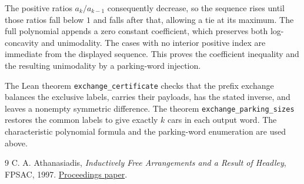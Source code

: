 \documentclass[11pt]{article}
\begin{document}
The positive ratios $a_k/a_{k-1}$ consequently decrease, so the
sequence rises until those ratios fall below $1$ and falls after
that, allowing a tie at its maximum. The full polynomial appends
a zero constant coefficient, which preserves both log-concavity
and unimodality. The cases with no interior positive index are
immediate from the displayed sequence. This proves the coefficient
inequality and the resulting unimodality by a parking-word injection.

The Lean theorem \texttt{exchange\_certificate} checks that the
prefix exchange balances the exclusive labels, carries their payloads,
has the stated inverse, and leaves a nonempty symmetric difference.
The theorem \texttt{exchange\_parking\_sizes} restores the common
labels to give exactly $k$ cars in each output word. The characteristic
polynomial formula and the parking-word enumeration are used above.

\begin{thebibliography}{9}
C. A. Athanasiadis, \emph{Inductively Free Arrangements and a Result
of Headley}, FPSAC, 1997.
\href{https://fpsac-archive.github.io/FPSAC97/ARTICLES/Athanasiadis.pdf}{Proceedings paper}.
\end{thebibliography}
\end{document}
